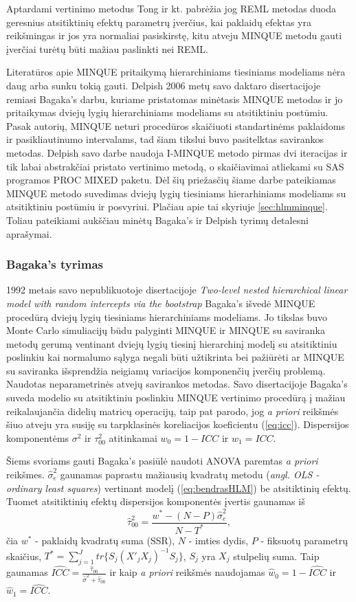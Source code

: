 \documentclass[11pt,a4paper]{article}
\begin{document}
\indent Aptardami vertinimo metodus Tong ir kt.\cite{MLbetterMINQUE} pabrėžia jog REML metodas duoda geresnius atsitiktinių efektų parametrų įverčius, kai paklaidų efektas yra reikšmingas ir jos yra normaliai pasiskirstę, kitu atveju MINQUE metodu gauti įverčiai turėtų būti mažiau paslinkti nei REML.

\indent Literatūros apie MINQUE pritaikymą hierarchiniams tiesiniams modeliams nėra daug arba sunku tokią gauti. Delpish\cite{delpish} 2006 metų savo daktaro disertacijoje remiasi Bagaka's\cite{bagaka} darbu, kuriame pristatomas minėtasis MINQUE metodas ir jo pritaikymas dviejų lygių hierarchiniams modeliams su atsitiktiniu postūmiu. Pasak autorių, MINQUE neturi procedūros skaičiuoti standartinėms paklaidoms ir pasikliautinumo intervalams, tad šiam tikslui buvo pasitelktas savirankos metodas. Delpish savo darbe naudoja I-MINQUE metodo pirmas dvi iteracijas ir tik labai abstrakčiai pristato vertinimo metodą, o skaičiavimai atliekami su SAS programos PROC MIXED paketu. Dėl šių priežasčių šiame darbe pateikiamas MINQUE metodo suvedimas dviejų lygių tiesiniams hierarhiniams modeliams su atsitiktiniu postūmiu ir posvyriui. Plačiau apie tai skyriuje \ref{sec:hlmminque}.  Toliau pateikiami aukščiau minėtų Bagaka's ir Delpish tyrimų detalesni aprašymai.

\subsubsection{Bagaka's tyrimas}\label{subsubsec:bminque}
1992 metais savo nepublikuotoje disertacijoje \textit{Two-level nested hierarchical linear model with random intercepts via the bootstrap}\cite{bagaka} Bagaka's išvedė MINQUE procedūrą dviejų lygių tiesiniams hierarchiniams modeliams. Jo tikslas buvo Monte Carlo simuliacijų būdu palyginti MINQUE ir MINQUE su saviranka metodų gerumą ventinant dviejų lygių tiesinį hierarchinį modelį su atsitiktiniu poslinkiu kai normalumo sąlyga negali būti užtikrinta bei pažiūrėti ar MINQUE su saviranka išsprendžia neigiamų variacijos komponenčių įverčių problemą. Naudotas neparametrinės atvejų savirankos metodas. Savo disertacijoje Bagaka's suveda modelio su atsitiktiniu poslinkiu MINQUE vertinimo procedūrą į mažiau reikalaujančia didelių matricų operacijų, taip pat parodo, jog \textit{a priori} reikšmės šiuo atveju yra susiję su tarpklasinės koreliacijos koeficientu (\ref{eq:icc}). Dispersijos komponentėms $\sigma^2$ ir $\tau_{00}^2$ atitinkamai $w_0=1-ICC$ ir $w_1=ICC$.

\indent Šiems svoriams gauti Bagaka's pasiūlė naudoti ANOVA paremtas \textit{a priori} reikšmes. $\hat{\sigma}^2_{e}$ gaunamas paprastu mažiausių kvadratų metodu (\textit{angl. OLS - ordinary least squares}) vertinant modelį (\ref{eq:bendrasHLM}) be atsitiktinių efektų. Tuomet atsitiktinių efektų dispersijos komponentės įvertis gaunamas iš
\[
\hat{\tau}_{00}^2=\frac{w^*-(N-P)\hat{\sigma}_e^2}{N-T^*},
\]
čia $w^*$ - paklaidų kvadratų suma (SSR), $N$ - imties dydis, $P$ - fiksuotų parametrų skaičius, $T^*=\sum_{j=1}^J tr\{S_j(X'_jX_j)^{-1}S_j\}$, $S_j$ yra $X_j$ stulpelių suma. Taip gaunamas $\widehat{ICC} = \frac{\hat{\tau}_{00}}{\hat{\sigma}^2+\hat{\tau}_{00}}$ ir kaip \textit{a priori} reikšmės naudojamas $\hat{w}_0=1-\widehat{ICC}$ ir $\hat{w}_1=\widehat{ICC}$.
\end{document}
